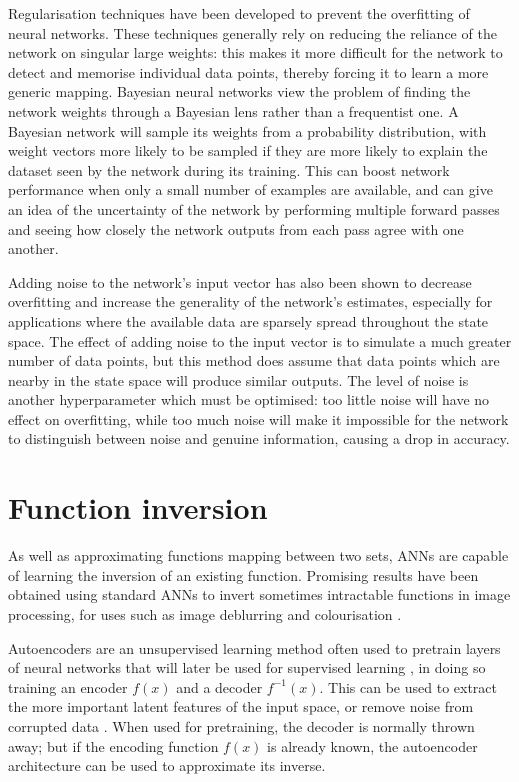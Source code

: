 \documentclass[../../main.tex]{subfiles}
\begin{document}
Regularisation techniques have been developed \cite{goodfellow16, srivastava14, ioffe15, li18} to prevent the overfitting of neural networks.
These techniques generally rely on reducing the reliance of the network on singular large weights:
this makes it more difficult for the network to detect and memorise individual data points, thereby forcing it to learn a more generic mapping.
Bayesian neural networks \cite{giryes16} view the problem of finding the network weights through a Bayesian lens rather than a frequentist one.
A Bayesian network will sample its weights from a probability distribution, with weight vectors more likely to be sampled if they are
more likely to explain the dataset seen by the network during its training.
This can boost network performance when only a small number of examples are available, and can give an idea of the uncertainty
of the network by performing multiple forward passes and seeing how closely the network outputs from each pass agree with one another.

Adding noise to the network's input vector \cite{zur09} has also been shown to decrease overfitting and increase the generality of the network's estimates,
especially for applications where the available data are sparsely spread throughout the state space.
The effect of adding noise to the input vector is to simulate a much greater number of data points, but this method does
assume that data points which are nearby in the state space will produce similar outputs.
The level of noise is another hyperparameter which must be optimised: too little noise will have no effect on overfitting,
while too much noise will make it impossible for the network to distinguish between noise and genuine information, causing a drop in accuracy.

\section{Function inversion}

As well as approximating functions mapping between two sets, ANNs are capable of learning the inversion of an existing function.
Promising results have been obtained using standard ANNs to invert sometimes intractable functions in image processing,
for uses such as image deblurring \cite{nah18} and colourisation \cite{nguyen16}.

Autoencoders are an unsupervised learning method often used to pretrain layers of neural networks that will later be used for supervised learning \cite{rumelhart86},
in doing so training an encoder $f(x)$ and a decoder $f^{-1}(x)$.
This can be used to extract the more important latent features of the input space, or remove noise from corrupted data \cite{vincent08}.
When used for pretraining, the decoder is normally thrown away; but if the encoding function $f(x)$ is already known, the autoencoder architecture can be used to approximate its inverse.
\end{document}
